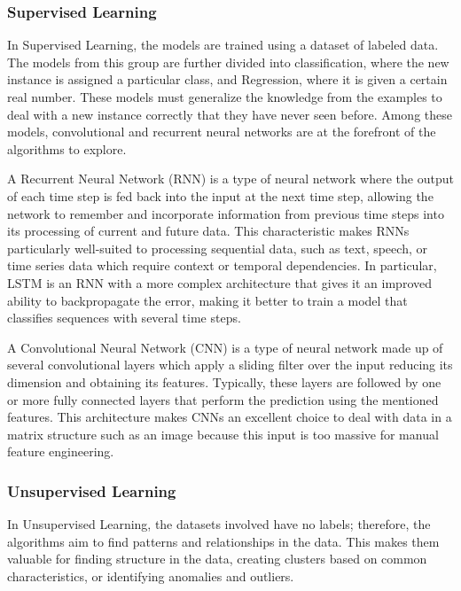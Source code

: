 \subsubsection{Supervised Learning}

In Supervised Learning, the models are trained using a dataset of labeled data. The models from this group are further divided into classification, where the new instance is assigned a particular class, and Regression, where it is given a certain real number. These models must generalize the knowledge from the examples to deal with a new instance correctly that they have never seen before. Among these models, convolutional and recurrent neural networks are at the forefront of the algorithms to explore.

A Recurrent Neural Network (RNN) is a type of neural network where the output of each time step is fed back into the input at the next time step, allowing the network to remember and incorporate information from previous time steps into its processing of current and future data. This characteristic makes RNNs particularly well-suited to processing sequential data, such as text, speech, or time series data which require context or temporal dependencies. In particular, LSTM is an RNN with a more complex architecture that gives it an improved ability to backpropagate the error, making it better to train a model that classifies sequences with several time steps.

A Convolutional Neural Network (CNN) is a type of neural network made up of several convolutional layers which apply a sliding filter over the input reducing its dimension and obtaining its features. Typically, these layers are followed by one or more fully connected layers that perform the prediction using the mentioned features. This architecture makes CNNs an excellent choice to deal with data in a matrix structure such as an image because this input is too massive for manual feature engineering.


\subsubsection{Unsupervised Learning}

In Unsupervised Learning, the datasets involved have no labels; therefore, the algorithms aim to find patterns and relationships in the data. This makes them valuable for finding structure in the data, creating clusters based on common characteristics, or identifying anomalies and outliers.

